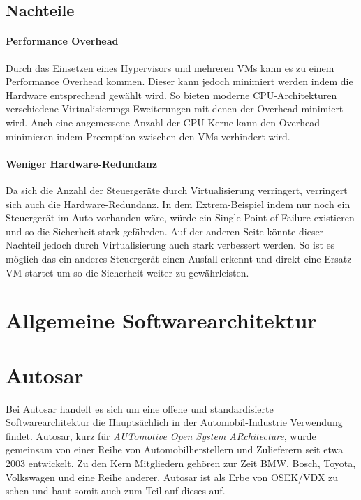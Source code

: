 \documentclass[
  a4paper,					    %
  twoside,
  DIV=calc,     				%
  bibliography=totoc,
  cleardoublepage=empty,
  ngerman,     					%
  final       					%
]{scrbook}
\begin{document}
\subsection{Nachteile}



\paragraph{Performance Overhead}
Durch das Einsetzen eines Hypervisors und mehreren VMs kann es zu einem Performance Overhead kommen. Dieser kann jedoch minimiert werden indem die Hardware entsprechend gewählt wird. So bieten moderne CPU-Architekturen verschiedene Virtualisierungs-Eweiterungen mit denen der Overhead minimiert wird. Auch eine angemessene Anzahl der CPU-Kerne kann den Overhead minimieren indem Preemption zwischen den VMs verhindert wird.

\paragraph{Weniger Hardware-Redundanz}
Da sich die Anzahl der Steuergeräte durch Virtualisierung verringert, verringert sich auch die Hardware-Redundanz. In dem Extrem-Beispiel indem nur noch ein Steuergerät im Auto vorhanden wäre, würde ein Single-Point-of-Failure existieren und so die Sicherheit stark gefährden. Auf der anderen Seite könnte dieser Nachteil jedoch durch Virtualisierung auch stark verbessert werden. So ist es möglich das ein anderes Steuergerät einen Ausfall erkennt und direkt eine Ersatz-VM startet um so die Sicherheit weiter zu gewährleisten. 






\section{Allgemeine Softwarearchitektur}
\label{sec:allg_softarch}






\section{Autosar}
\label{sec:Autosar}
Bei Autosar handelt es sich um eine offene und standardisierte Softwarearchitektur die Hauptsächlich in der Automobil-Industrie Verwendung findet. Autosar, kurz für \emph{AUTomotive Open System ARchitecture}, wurde gemeinsam von einer Reihe von Automobilherstellern und Zulieferern seit etwa 2003 entwickelt. Zu den Kern Mitgliedern gehören zur Zeit BMW, Bosch, Toyota, Volkswagen und eine Reihe anderer. Autosar ist als Erbe von OSEK/VDX zu sehen und baut somit auch zum Teil auf dieses auf.
\end{document}
